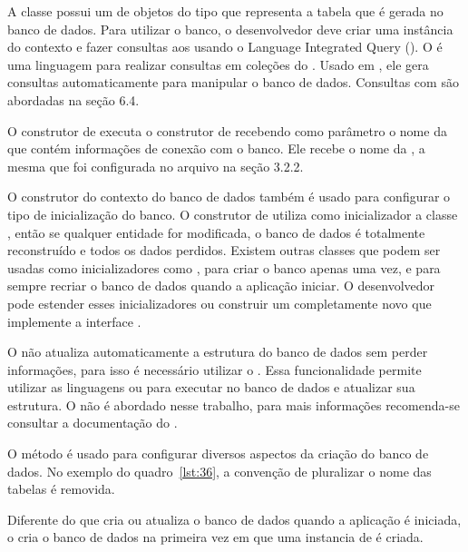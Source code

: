 A classe  possui um  de objetos do tipo  que representa a tabela que é gerada no banco de dados. Para utilizar o banco, o desenvolvedor deve criar uma instância do contexto e fazer consultas aos  usando o Language Integrated Query (). O  é uma linguagem para realizar consultas em coleções do . Usado em , ele gera consultas  automaticamente para manipular o banco de dados. Consultas com  são abordadas na seção 6.4.

O construtor de  executa o construtor de  recebendo como parâmetro o nome da  que contém informações de conexão com o banco. Ele recebe o nome da  , a mesma que foi configurada no arquivo  na seção 3.2.2.

O construtor do contexto do banco de dados também é usado para configurar o tipo de inicialização do banco. O construtor de  utiliza como inicializador a classe , então se qualquer entidade for modificada, o banco de dados é totalmente reconstruído e todos os dados perdidos. Existem outras classes que podem ser usadas como inicializadores como , para criar o banco apenas uma vez, e  para sempre recriar o banco de dados quando a aplicação iniciar. O desenvolvedor pode estender esses inicializadores ou construir um completamente novo que implemente a interface .

O  não atualiza automaticamente a estrutura do banco de dados sem perder informações, para isso é necessário utilizar o . Essa funcionalidade permite utilizar as linguagens  ou  para executar  no banco de dados e atualizar sua estrutura. O  não é abordado nesse trabalho, para mais informações recomenda-se consultar a documentação do .

O método  é usado para configurar diversos aspectos da criação do banco de dados.  No exemplo do quadro~\ref{lst:36}, a convenção de pluralizar o nome das tabelas é removida.

Diferente do  que cria ou atualiza o banco de dados quando a aplicação é iniciada, o  cria o banco de dados na primeira vez em que uma instancia de  é criada.

